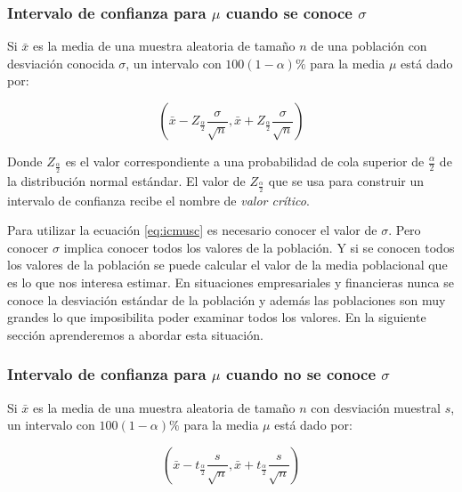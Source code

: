 \documentclass[letterpaper,]{book}
\begin{document}
\hypertarget{jt}{%
\subsubsection{\texorpdfstring{Intervalo de confianza para \(\mu\) cuando se conoce \(\sigma\)}{Intervalo de confianza para \textbackslash{}mu cuando se conoce \textbackslash{}sigma}}\label{jt}}

Si \(\bar{x}\) es la media de una muestra aleatoria de tamaño \(n\) de una población con desviación conocida \(\sigma\), un intervalo con \(100\left(1-\alpha\right)\%\) para la media \(\mu\) está dado por:

\begin{equation} 
  \left(\bar{x} - Z_{\frac{\alpha}{2}}\dfrac{\sigma}{\sqrt{n}}, \bar{x} + Z_{\frac{\alpha}{2}}\dfrac{\sigma}{\sqrt{n}}  \right)
  \label{eq:icmusc}
\end{equation}

Donde \(Z_{\frac{\alpha}{2}}\) es el valor correspondiente a una probabilidad de cola superior de \(\frac{\alpha}{2}\) de la distribución normal estándar. El valor de \(Z_{\frac{\alpha}{2}}\) que se usa para construir un intervalo de confianza recibe el nombre de \emph{valor crítico}.

Para utilizar la ecuación \eqref{eq:icmusc} es necesario conocer el valor de \(\sigma\). Pero conocer \(\sigma\) implica conocer todos los valores de la población. Y si se conocen todos los valores de la población se puede calcular el valor de la media poblacional que es lo que nos interesa estimar. En situaciones empresariales y financieras nunca se conoce la desviación estándar de la población y además las poblaciones son muy grandes lo que imposibilita poder examinar todos los valores. En la siguiente sección aprenderemos a abordar esta situación.

\hypertarget{icsd}{%
\subsubsection{\texorpdfstring{Intervalo de confianza para \(\mu\) cuando no se conoce \(\sigma\)}{Intervalo de confianza para \textbackslash{}mu cuando no se conoce \textbackslash{}sigma}}\label{icsd}}

Si \(\bar{x}\) es la media de una muestra aleatoria de tamaño \(n\) con desviación muestral \(s\), un intervalo con \(100\left(1-\alpha\right)\%\) para la media \(\mu\) está dado por:

\begin{equation} 
  \left(\bar{x} - t_{\frac{\alpha}{2}}\dfrac{s}{\sqrt{n}}, \bar{x} + t_{\frac{\alpha}{2}}\dfrac{s}{\sqrt{n}}  \right)
  \label{eq:icmusd}
\end{equation}
\end{document}
